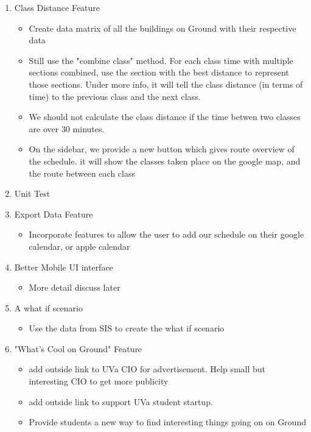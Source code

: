 \documentclass[letterpaper,12pt]{article}
\begin{document}
\begin{enumerate}
    \item Class Distance Feature
    \begin{itemize}
        \item Create data matrix of all the buildings on Ground with their respective data
        \item Still use the "combine class" method. For each class time with
        multiple sections combined, use the section with the best distance 
        to represent those sections. Under more info, it will tell the class distance
        (in terms of time) to the previous class and the next class. 
        \item We should not calculate the class distance if the time betwen two classes are over 30 minutes.
        \item On the sidebar, we provide a new button which gives route overview of the schedule. 
        it will show the classes taken place on the google map, and the route between each class
    \end{itemize}

    \item Unit Test

    \item Export Data Feature
    \begin{itemize}
        \item Incorporate features to allow the user to add our schedule on their
        google calendar, or apple calendar
    \end{itemize}

    \item Better Mobile UI interface
    \begin{itemize}
        \item More detail discuss later
    \end{itemize}

    \item A what if scenario
    \begin{itemize}
        \item Use the data from SIS to create the what if scenario
    \end{itemize}
    
    \item "What's Cool on Ground" Feature
    \begin{itemize}
        \item add outside link to UVa CIO for advertisement. Help small but interesting CIO to get more publicity
        \item add outside link to support UVa student startup. 
        \item Provide students a new way to find interesting things going on on Ground
    \end{itemize}
\end{enumerate}
\end{document}
